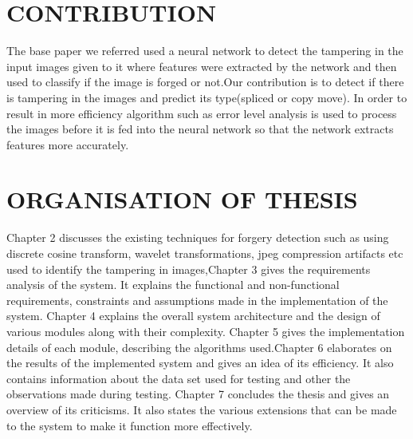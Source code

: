 \section{CONTRIBUTION}
The base paper we referred used a neural network to detect the tampering in the input images given to it where features were extracted by the network and then used to classify if the image is forged or not.Our contribution is to detect if there is tampering in the images and predict its type(spliced or copy move). In order to result in more efficiency algorithm such as error level analysis is used to process the images before it is fed into the neural network so that the network extracts features more accurately.
\section{ORGANISATION OF THESIS}
Chapter 2 discusses the existing techniques for forgery detection such as using discrete cosine transform, wavelet transformations, jpeg compression artifacts etc used to identify the tampering in images,Chapter 3 gives the requirements analysis of the system. It explains the functional and non-functional requirements, constraints and assumptions made in the implementation of the system. Chapter 4 explains the overall system architecture and the design of various modules along with their complexity. Chapter 5 gives the implementation details of each module, describing the algorithms used.Chapter 6 elaborates on the results of the implemented system and gives an idea of its efficiency. It also contains information about the data set used for testing and other the observations made during testing. Chapter 7 concludes the thesis and gives an overview of its criticisms. It also states the various extensions that can be made to the system to make it function more effectively.

